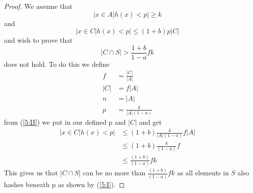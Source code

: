 \begin{proof}
    We assume that
    \begin{equation}\label{5:I}
        |{x \in A | h(x) < p}| \ge k 
    \end{equation}
    and
    \begin{equation}\label{5:II}
        |{x \in C | h(x) < p}| \le (1 + b)p|C| 
    \end{equation}
    and wish to prove that
    \begin{equation}
        |C \cap S| > \frac{1 + b}{1 - a}fk
    \end{equation}
    does not hold. To do this we define
    \begin{align*}
        f &= \frac{|C|}{|A|} \\
        |C| &= f |A|\\
        n &= |A|\\
        p &= \frac{k}{|A|(1-a)}
    \end{align*}
    from (\ref{5:II}) we put in our defined p and $|C|$ and get
    \begin{align*}\label{5:II}
        |{x \in C | h(x) < p}| &\le (1 + b)\frac{k}{|A|(1-a)} f |A|\\
         &\le (1 + b)\frac{k}{(1-a)} f\\
         &\le \frac{(1 + b)}{(1-a)} fk 
    \end{align*}
    This gives us that $|C \cap S|$ can be no more than
    $\frac{(1 + b)}{(1-a)} fk$ as all elements in $S$ also hashes beneath p as shown by (\ref{5:I}).
\end{proof}
